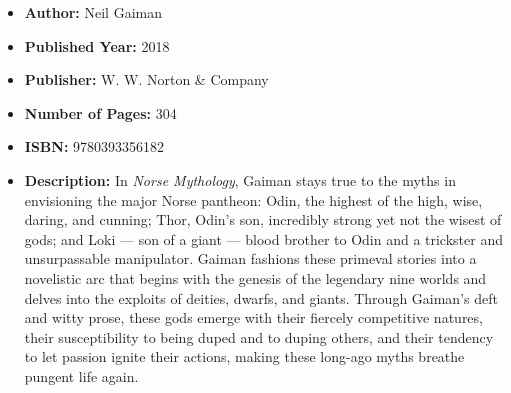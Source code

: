 \documentclass{tufte-handout}
\begin{document}
\begin{itemize}
    \item[] \textbf{Author:} Neil Gaiman
    \item[] \textbf{Published Year:} 2018 
    \item[] \textbf{Publisher:} W. W. Norton \& Company
    \item[] \textbf{Number of Pages:} 304      
    \item[] \textbf{ISBN:} 9780393356182
    \item[] \textbf{Description:} In \textit{Norse Mythology}, Gaiman stays true to the myths in envisioning the major Norse pantheon: Odin, the highest of the high, wise, daring, and cunning; Thor, Odin’s son, incredibly strong yet not the wisest of gods; and Loki --- son of a giant --- blood brother to Odin and a trickster and unsurpassable manipulator. Gaiman fashions these primeval stories into a novelistic arc that begins with the genesis of the legendary nine worlds and delves into the exploits of deities, dwarfs, and giants. Through Gaiman’s deft and witty prose, these gods emerge with their fiercely competitive natures, their susceptibility to being duped and to duping others, and their tendency to let passion ignite their actions, making these long-ago myths breathe pungent life again.
\end{itemize}
\end{document}
